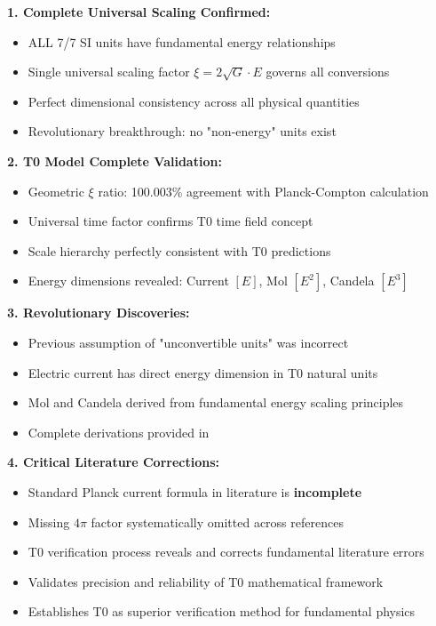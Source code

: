 \documentclass[12pt,a4paper]{article}
\begin{document}
\begin{tcolorbox}[colback=green!5!white,colframe=green!75!black,title=SI-Planck Verification Results]
	\textbf{1. Complete Universal Scaling Confirmed:}
	\begin{itemize}
		\item ALL 7/7 SI units have fundamental energy relationships
		\item Single universal scaling factor $\xi = 2\sqrt{G} \cdot E$ governs all conversions
		\item Perfect dimensional consistency across all physical quantities
		\item Revolutionary breakthrough: no "non-energy" units exist
	\end{itemize}
	
	\textbf{2. T0 Model Complete Validation:}
	\begin{itemize}
		\item Geometric $\xi$ ratio: 100.003\% agreement with Planck-Compton calculation
		\item Universal time factor confirms T0 time field concept
		\item Scale hierarchy perfectly consistent with T0 predictions
		\item Energy dimensions revealed: Current $[E]$, Mol $[E^2]$, Candela $[E^3]$
	\end{itemize}
	
	\textbf{3. Revolutionary Discoveries:}
	\begin{itemize}
		\item Previous assumption of "unconvertible units" was incorrect
		\item Electric current has direct energy dimension in T0 natural units
		\item Mol and Candela derived from fundamental energy scaling principles
		\item Complete derivations provided in \cite{pascher_mol_candela_2025}
	\end{itemize}
	
	\textbf{4. Critical Literature Corrections:}
	\begin{itemize}
		\item Standard Planck current formula in literature is \textbf{incomplete}
		\item Missing $4\pi$ factor systematically omitted across references
		\item T0 verification process reveals and corrects fundamental literature errors
		\item Validates precision and reliability of T0 mathematical framework
		\item Establishes T0 as superior verification method for fundamental physics
	\end{itemize}
\end{tcolorbox}	
\end{document}
